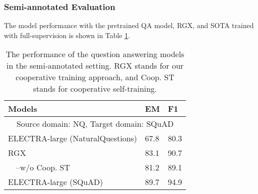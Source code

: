 \documentclass[11pt,a4paper]{article}
\begin{document}
\subsubsection{Semi-annotated Evaluation}
The model performance with the pretrained QA model, RGX, and SOTA trained with full-supervision is shown in Table \ref{tab:semi}.

\begin{table}[h]
\small
\centering
\begin{tabular}{@{}lll@{}}
\toprule
\textbf{Models}             & \textbf{EM}   & \textbf{F1}   \\ \midrule
\multicolumn{3}{c}{Source domain: NQ, Target domain: SQuAD}      \\ \hdashline[1.5pt/2pt]
ELECTRA-large (NaturalQuestions)    & 67.8 & 80.3 \\
RGX  & 83.1 & 90.7 \\
$\quad$--w/o Coop. ST    & 81.2 & 89.1 \\
ELECTRA-large (SQuAD)     & 89.7 & 94.9 \\ \bottomrule
\end{tabular}
\caption{The performance of the question answering models in the semi-annotated setting. RGX stands for our cooperative training approach, and Coop. ST stands for cooperative self-training.}
\label{tab:semi}
\end{table}
\end{document}
